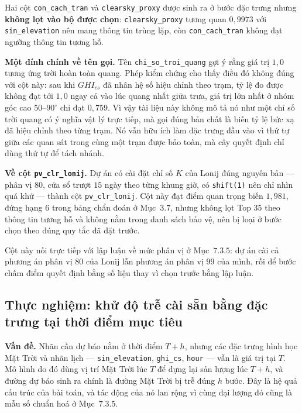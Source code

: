 Hai cột \texttt{con\_cach\_tran} và \texttt{clearsky\_proxy} được sinh ra ở bước đặc trưng nhưng
\textbf{không lọt vào bộ được chọn}: \texttt{clearsky\_proxy} tương quan $0{,}9973$ với
\texttt{sin\_elevation} nên mang thông tin trùng lặp, còn \texttt{con\_cach\_tran} không đạt ngưỡng
thông tin tương hỗ.

\textbf{Một đính chính về tên gọi.} Tên \texttt{chi\_so\_troi\_quang} gợi ý rằng giá trị $1{,}0$
tương ứng trời hoàn toàn quang. Phép kiểm chứng cho thấy điều đó không đúng với cột này: sau
khi $GHI_{cs}$ đã nhân hệ số hiệu chỉnh theo trạm, tỷ lệ đo được không đạt tới $1{,}0$
ngay cả vào lúc quang nhất giữa trưa, giá trị lớn nhất ở nhóm góc cao $50$--$90^\circ$ chỉ
đạt $0{,}759$. Vì vậy tài liệu này không mô tả nó như một chỉ số trời quang có ý nghĩa vật lý
trực tiếp, mà gọi đúng bản chất là biến tỷ lệ bức xạ đã hiệu chỉnh theo từng trạm. Nó
vẫn hữu ích làm đặc trưng đầu vào vì thứ tự giữa các quan sát trong cùng một trạm được bảo
toàn, mà cây quyết định chỉ dùng thứ tự để tách nhánh.

\textbf{Về cột \texttt{pv\_clr\_lonij}.} Dự án có cài đặt chỉ số $K$ của Lonij đúng nguyên bản ---
phân vị $80$, cửa sổ trượt $15$ ngày theo từng khung giờ, có \texttt{shift(1)} nên chỉ nhìn quá
khứ --- thành cột \texttt{pv\_clr\_lonij}. Cột này đạt điểm quan trọng biến $1{,}981$, đứng hạng $6$
trong bảng chẩn đoán ở Mục~$3.7$, nhưng không lọt Top $35$ theo thông tin tương hỗ và không nằm
trong danh sách bảo vệ, nên bị loại ở bước chọn theo đúng quy tắc đã đặt trước.

Cột này nối trực tiếp với lập luận về mức phân vị ở Mục~$7.3.5$: dự án cài cả phương án phân vị
$80$ của Lonij lẫn phương án phân vị $99$ của mình, rồi để bước chấm điểm quyết định bằng số
liệu thay vì chọn trước bằng lập luận.

\FloatBarrier
\subsection{Thực nghiệm: khử độ trễ cài sẵn bằng đặc trưng tại thời điểm mục tiêu}

\textbf{Vấn đề.} Nhãn cần dự báo nằm ở thời điểm $T{+}h$, nhưng các đặc trưng hình học Mặt Trời
và nhãn lịch --- \texttt{sin\_elevation}, \texttt{ghi\_cs}, \texttt{hour} --- vẫn là giá trị tại $T$. Mô
hình do đó dùng vị trí Mặt Trời lúc $T$ để dựng lại sản lượng lúc $T{+}h$, và đường dự báo sinh
ra chính là đường Mặt Trời bị trễ đúng $h$ bước. Đây là hệ quả cấu trúc của bài toán, và tác
động của nó lan rộng vì cùng đại lượng đó cũng là mẫu số chuẩn hoá ở Mục~$7.3.5$.


